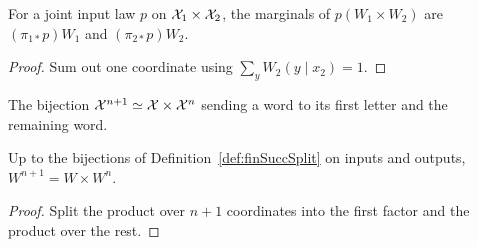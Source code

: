 \begin{lemma}
  \label{lem:output_prod_marginals}
  \leanok
  For a joint input law $p$ on $\mathcal X_1 \times \mathcal X_2$, the marginals of $p(W_1 \times W_2)$ are
  $(\pi_{1*} p) W_1$ and $(\pi_{2*} p) W_2$.
\end{lemma}
\begin{proof}
  \leanok
  Sum out one coordinate using $\sum_y W_2(y \mid x_2) = 1$.
\end{proof}

\begin{definition}
  \label{def:finSuccSplit}
  \leanok
  The bijection $\mathcal X^{n+1} \simeq \mathcal X \times \mathcal X^n$ sending a word to its first letter and
  the remaining word.
\end{definition}

\begin{lemma}
  \label{lem:pow_succ_eq}
  \leanok
  Up to the bijections of Definition~\ref{def:finSuccSplit} on inputs and outputs,
  $W^{n+1} = W \times W^n$.
\end{lemma}
\begin{proof}
  \leanok
  Split the product over $n + 1$ coordinates into the first factor and the product over the rest.
\end{proof}
